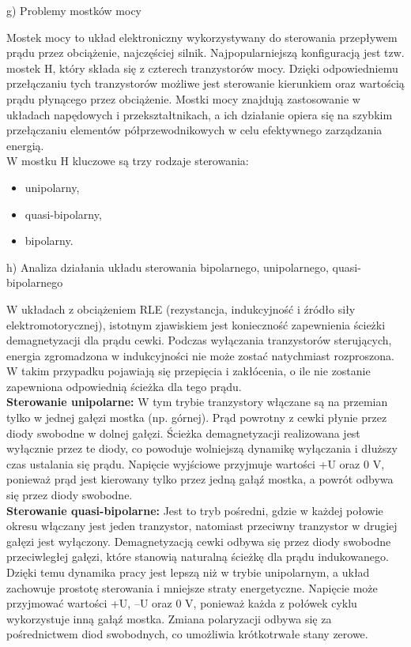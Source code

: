 \documentclass[11pt]{article}
\begin{document}
g) Problemy mostków mocy

Mostek mocy to układ elektroniczny wykorzystywany do sterowania przepływem prądu przez obciążenie, najczęściej silnik. Najpopularniejszą konfiguracją jest tzw. mostek H, który składa się z czterech tranzystorów mocy. Dzięki odpowiedniemu przełączaniu tych tranzystorów możliwe jest sterowanie kierunkiem oraz wartością prądu płynącego przez obciążenie. Mostki mocy znajdują zastosowanie w układach napędowych i przekształtnikach, a ich działanie opiera się na szybkim przełączaniu elementów półprzewodnikowych w celu efektywnego zarządzania energią.\\

W mostku H kluczowe są trzy rodzaje sterowania:
\begin{itemize}
\item unipolarny,
\item quasi-bipolarny,
\item bipolarny.
\end{itemize}
\vspace{1em}

h) Analiza działania układu sterowania bipolarnego, unipolarnego, quasi-bipolarnego

W układach z obciążeniem RLE (rezystancja, indukcyjność i źródło siły elektromotorycznej), istotnym zjawiskiem jest konieczność zapewnienia ścieżki demagnetyzacji dla prądu cewki. Podczas wyłączania tranzystorów sterujących, energia zgromadzona w indukcyjności nie może zostać natychmiast rozproszona. W takim przypadku pojawiają się przepięcia i zakłócenia, o ile nie zostanie zapewniona odpowiednią ścieżka dla tego prądu.\\

\textbf{Sterowanie unipolarne:}
W tym trybie tranzystory włączane są na przemian tylko w jednej gałęzi mostka (np. górnej). Prąd powrotny z cewki płynie przez diody swobodne w dolnej gałęzi. Ścieżka demagnetyzacji realizowana jest wyłącznie przez te diody, co powoduje wolniejszą dynamikę wyłączania i dłuższy czas ustalania się prądu.
Napięcie wyjściowe przyjmuje wartości +U oraz 0 V, ponieważ prąd jest kierowany tylko przez jedną gałąź mostka, a powrót odbywa się przez diody swobodne.\\

\textbf{Sterowanie quasi-bipolarne:}
Jest to tryb pośredni, gdzie w każdej połowie okresu włączany jest jeden tranzystor, natomiast przeciwny tranzystor w drugiej gałęzi jest wyłączony. Demagnetyzacją cewki odbywa się przez diody swobodne przeciwległej gałęzi, które stanowią naturalną ścieżkę dla prądu indukowanego. Dzięki temu dynamika pracy jest lepszą niż w trybie unipolarnym, a układ zachowuje prostotę sterowania i mniejsze straty energetyczne.
Napięcie może przyjmować wartości +U, –U oraz 0 V, ponieważ każda z połówek cyklu wykorzystuje inną gałąź mostka. Zmiana polaryzacji odbywa się za pośrednictwem diod swobodnych, co umożliwia krótkotrwałe stany zerowe.\\
\end{document}
